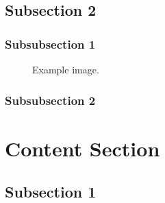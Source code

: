 \documentclass[12pt, spanish]{article} %
\begin{document}

\subsection{Subsection 2} %

\lipsum[2] %


\subsubsection{Subsubsection 1} %

\lipsum[3] %

\begin{figure}[H] %
\caption{Example image.}
\label{fig:speciation}
\end{figure}


\subsubsection{Subsubsection 2} %

\lipsum[4] %


\section{Content Section} %

\lipsum[5] %


\subsection{Subsection 1} %
\end{document}
